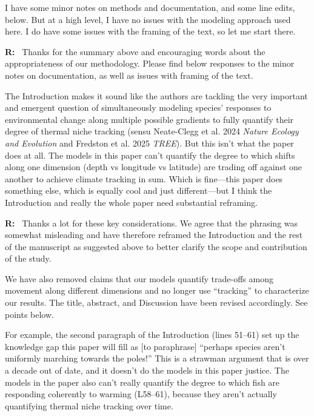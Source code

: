 \documentclass[11pt]{article}
\newcommand{\reviewer}[1]{\par\medskip\noindent\textcolor{revcolor}{#1}\par}
\newenvironment{reply}
{\par\smallskip\begingroup\color{replycolor}\noindent\textbf{R:}\ }
{\endgroup\par\medskip}
\begin{document}
\reviewer{I have some minor notes on methods and documentation, and some line edits, below. But at a high level, I have no issues with the modeling approach used here. I do have some issues with the framing of the text, so let me start there.}


\begin{reply}
Thanks for the summary above and encouraging words about the appropriateness of our methodology. Please find below responses to the minor notes on documentation, as well as issues with framing of the text. 
\end{reply}

\reviewer{The Introduction makes it sound like the authors are tackling the very important and emergent question of simultaneously modeling species' responses to environmental change along multiple possible gradients to fully quantify their degree of thermal niche tracking (sensu Neate-Clegg et al. 2024 \textit{Nature Ecology and Evolution} and Fredston et al. 2025 \textit{TREE}). But this isn't what the paper does at all. The models in this paper can't quantify the degree to which
shifts along one dimension (depth vs longitude vs latitude) are trading off against one another to achieve climate tracking in sum. Which is fine---this paper does something else, which is equally cool and just different---but I think the Introduction and really the whole paper need substantial reframing.}

\begin{reply}
Thanks a lot for these key considerations. We agree that the phrasing was somewhat misleading and have therefore reframed the Introduction and the rest of the manuscript as suggested above to better clarify the scope and contribution of the study.  

We have also removed claims that our models quantify trade-offs among movement along different dimensions and no longer use ``tracking'' to characterize our results. The title, abstract, and Discussion have been revised accordingly. See points below.
\end{reply}

\reviewer{For example, the second paragraph of the Introduction (lines 51--61) set up the knowledge gap this paper will fill as [to paraphrase] ``perhaps species aren't uniformly marching towards the poles!'' This is a strawman argument that is over a decade out of date, and it doesn't do the models in this paper justice. The models in the paper also can't really quantify the degree to which fish are responding coherently to warming (L58--61), because they aren't actually quantifying thermal niche tracking over time.}
\end{document}
